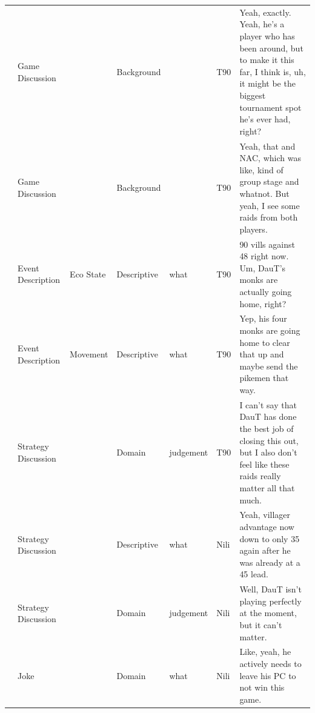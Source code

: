 {\begin{longtable}{@{}>{\theAppRow}r|L{2.3cm}L{2.2cm}L{1.4cm}L{2.2cm}L{0.5cm}U{5.6cm}@{}}
    & Game Discussion       &                      & Background  &                   & T90     & Yeah, exactly. Yeah, he's a player who has been around, but to make it this far, I think is, uh, it might be the biggest tournament spot he's ever had, right?                                                           \\
    & Game Discussion       &                      & Background  &                   & T90     & Yeah, that and NAC, which was like, kind of group stage and whatnot. But yeah, I see some raids from both players.                                                                                                       \\
    & Event Description     & Eco State            & Descriptive   & what              & T90     & 90 vills against 48 right now. Um, DauT's monks are actually going home, right?                                                                                                                                          \\
    & Event Description     & Movement             & Descriptive   & what              & T90     & Yep, his four monks are going home to clear that up and maybe send the pikemen that way.                                                                                                                                 \\
    & Strategy Discussion   &                      & Domain      & judgement         & T90     & I can't say that DauT has done the best job of closing this out, but I also don't feel like these raids really matter all that much.                                                                                     \\
    & Strategy Discussion   &                      & Descriptive   & what              & Nili    & Yeah, villager advantage now down to only 35 again after he was already at a 45 lead.                                                                                                                                    \\
    & Strategy Discussion   &                      & Domain      & judgement         & Nili    & Well, DauT isn't playing perfectly at the moment, but it can't matter.                                                                                                                                                   \\
    & Joke                  &                      & Domain      & what              & Nili    & Like, yeah, he actively needs to leave his PC to not win this game.                                                                                                                                                      \\

\end{longtable}}
